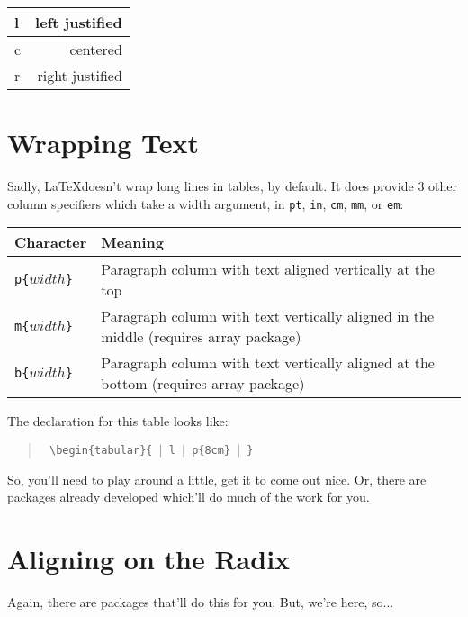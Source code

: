 \begin{center}
	\begin{tabular}{ l | r | }
		\hline 
		l & left justified \\
		\hline 
		c & centered \\
		\hline 
		r & right justified \\
		\hline 
	\end{tabular}
\end{center}


\section{Wrapping Text}
Sadly, \LaTeX doesn't wrap long lines in tables, by default.  It does
provide 3 other column specifiers which take a width argument, in
\texttt{pt}, \texttt{in}, \texttt{cm}, \texttt{mm}, or \texttt{em}:

\begin{center}
	\begin{tabular}{ | l | p{8cm} | }
		\hline
		Character & Meaning \\
		\hline
		\texttt{p\{$width$\}}
			& Paragraph column with text aligned vertically at the top \\
		\hline
		\texttt{m\{$width$\}}
			& Paragraph column with text vertically aligned in the middle (requires
			array package) \\
		\hline
		\texttt{b\{$width$\}}
			& Paragraph column with text vertically aligned at the bottom (requires
			array package) \\
		\hline
	\end{tabular}
\end{center}

The declaration for this table looks like:

\begin{quote}
	\texttt{ \textbackslash{}begin\{tabular\}\{ $\vert$ l $\vert$ p\{8cm\} $\vert$ \} }
\end{quote}

So, you'll need to play around a little, get it to come out nice.  Or, there
are packages already developed which'll do much of the work for you.

\section{Aligning on the Radix}
\label{radalign}

Again, there are packages that'll do this for you.  But, we're here, so...

